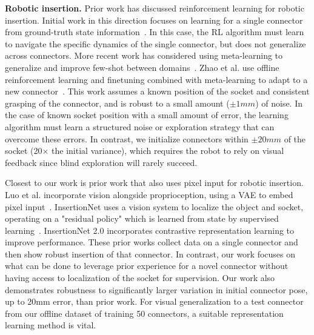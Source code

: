 \documentclass[letterpaper, 10 pt, conference, final]{ieeeconf}   %
\begin{document}
\textbf{Robotic insertion.} Prior work has discussed reinforcement learning for robotic insertion.
Initial work in this direction focuses on learning
for a single connector from ground-truth state information~\cite{lian2021insertionbenchmark, johannink18residualrl, schoettler2019insertion}.
In this case, the RL algorithm must learn to navigate the specific dynamics of the single connector, but does not generalize across connectors.
More recent work has considered using meta-learning to generalize and improve few-shot between domains~\cite{Schoettler2020}.
Zhao et al. use offline reinforcement learning and finetuning combined with  meta-learning to adapt to a new connector~\cite{zhao2022insertion}.
This work assumes a known position of the socket and consistent grasping of the connector, and is robust to a small amount ($\pm1mm$) of noise.
In the case of known socket position with a small amount of error, the learning algorithm must learn a structured noise or exploration strategy that can overcome these errors.
In contrast, we initialize connectors within $\pm20mm$ of the socket (20$\times$ the initial variance), which requires the robot to rely on visual feedback since blind exploration will rarely succeed.

Closest to our work is prior work that also uses pixel input for robotic insertion.
Luo et al. incorporate vision alongside proprioception, using a VAE to embed pixel input~\cite{luo2021insertion}.
InsertionNet uses a vision system to localize the object and socket, operating on a "residual policy" which is learned from state by supervised learning~\cite{spector2021insertionnet}.
InsertionNet 2.0 incorporates contrastive representation learning to improve performance.
These prior works collect data on a single connector and then show robust insertion of that connector.
In contrast, our work focuses on what can be done to leverage prior experience for a novel connector without having access to localization of the socket for supervision.
Our work also demonstrates robustness to significantly larger variation in initial connector pose, up to 20mm error, than prior work.
For visual generalization to a test connector from our offline dataset of training 50 connectors, a suitable representation learning method is vital.
\end{document}
